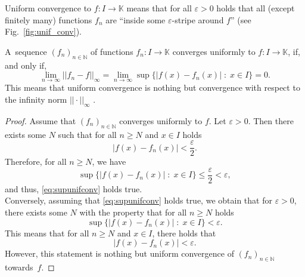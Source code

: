 \begin{Remark}{}
Uniform convergence to $f:I\to\mathbb{K}$ means that for all $\varepsilon>0$ holds that all (except finitely many) functions $f_n$ are ``inside some $\varepsilon$-stripe around $f$'' 
(see Fig.\ \ref{fig:unif_conv}).
\end{Remark}

\begin{Theorem}{}
A~sequence $(f_n)_{n\in\mathbb{N}}$ of functions $f_n:I\to\mathbb{K}$ converges uniformly to $f:I\to\mathbb{K}$, if, and only if,
\begin{equation}\lim_{n\to\infty}||f_n-f||_\infty=\lim_{n\to\infty}\sup\{|f(x)-f_n(x)|\;:\;x\in I\}=0.\label{eq:supunifconv}\end{equation}
This means that uniform convergence is nothing but convergence with respect to the infinity norm $||\cdot||_\infty$ .
\end{Theorem}



\begin{proof}
Assume that $(f_n)_{n\in\mathbb{N}}$ converges uniformly to $f$. Let $\varepsilon>0$. Then there exists some $N$ such that for all $n\geq N$ and $x\in I$ holds
\[|f(x)-f_n(x)|<\frac\varepsilon2.\]
Therefore, for all $n\geq N$, we have
\[\sup\{|f(x)-f_n(x)|\;:\;x\in I\}\leq\frac\varepsilon2<\varepsilon,\]
and thus, \eqref{eq:supunifconv} holds true.\\
Conversely, assuming that \eqref{eq:supunifconv} holds true, we obtain that for $\varepsilon>0$, there exists some $N$ with the property that for all $n\geq N$ holds
\[\sup\{|f(x)-f_n(x)|\;:\;x\in I\}<\varepsilon.\]
This means that for all $n\geq N$ and $x\in I$, there holds that
\[|f(x)-f_n(x)|<\varepsilon.\]
However, this statement is nothing but uniform convergence of $(f_n)_{n\in\mathbb{N}}$ towards~$f$.
\end{proof}


